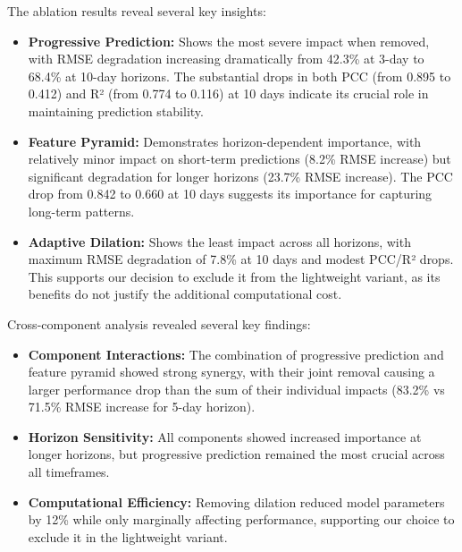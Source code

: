     The ablation results reveal several key insights:
    
    \begin{itemize}
        \item \textbf{Progressive Prediction:} Shows the most severe impact when removed, with RMSE degradation increasing dramatically from 42.3\% at 3-day to 68.4\% at 10-day horizons. The substantial drops in both PCC (from 0.895 to 0.412) and R² (from 0.774 to 0.116) at 10 days indicate its crucial role in maintaining prediction stability.
        
        \item \textbf{Feature Pyramid:} Demonstrates horizon-dependent importance, with relatively minor impact on short-term predictions (8.2\% RMSE increase) but significant degradation for longer horizons (23.7\% RMSE increase). The PCC drop from 0.842 to 0.660 at 10 days suggests its importance for capturing long-term patterns.
        
        \item \textbf{Adaptive Dilation:} Shows the least impact across all horizons, with maximum RMSE degradation of 7.8\% at 10 days and modest PCC/R² drops. This supports our decision to exclude it from the lightweight variant, as its benefits do not justify the additional computational cost.
    \end{itemize}
    
    Cross-component analysis revealed several key findings:
    
    \begin{itemize}
        \item \textbf{Component Interactions:} The combination of progressive prediction and feature pyramid showed strong synergy, with their joint removal causing a larger performance drop than the sum of their individual impacts (83.2\% vs 71.5\% RMSE increase for 5-day horizon).
        
        \item \textbf{Horizon Sensitivity:} All components showed increased importance at longer horizons, but progressive prediction remained the most crucial across all timeframes.
        
        \item \textbf{Computational Efficiency:} Removing dilation reduced model parameters by 12\% while only marginally affecting performance, supporting our choice to exclude it in the lightweight variant.
    \end{itemize}
    
